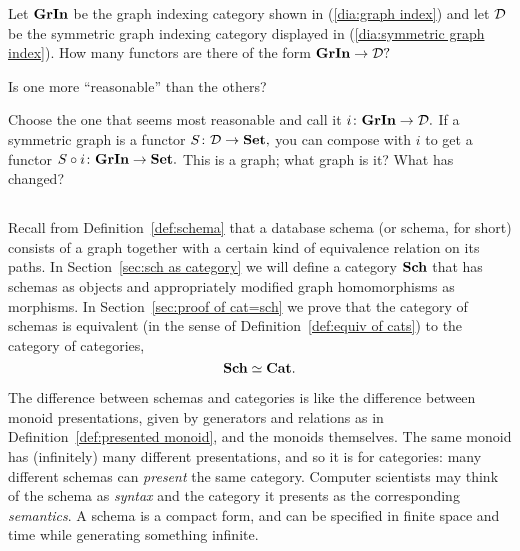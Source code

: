 \documentclass[../main/CT4S-EN-RU]{subfiles}
\begin{document}
\begin{exerciseRUS}
\end{exerciseRUS}

\begin{exerciseENG}
Let ${\mathbf{GrIn}}$ be the graph indexing category shown in (\ref{dia:graph index}) and let $\mathcal{D}$ be the symmetric graph indexing category displayed in (\ref{dia:symmetric graph index}).
\sexc How many functors are there of the form ${\mathbf{GrIn}}\rightarrow\mathcal{D}?$
\item Is one more “reasonable” than the others? 
\item Choose the one that seems most reasonable and call it $i\colon{\mathbf{GrIn}}\rightarrow\mathcal{D}.$ If a symmetric graph is a functor $S\colon\mathcal{D}\rightarrow{\mathbf{Set}},$ you can compose with $i$ to get a functor $S\circ i\colon{\mathbf{GrIn}}\rightarrow{\mathbf{Set}}.$ This is a graph; what graph is it? What has changed?
\endsexc
\end{exerciseENG}

\begin{exerciseRUS}
\end{exerciseRUS}


\subsection{}\label{sec:schemas and cats intro}

\begin{blockENG}
Recall from Definition~\ref{def:schema} that a database schema (or schema, for short) consists of a graph together with a certain kind of equivalence relation on its paths. In Section~\ref{sec:sch as category} we will define a category ${\mathbf{Sch}}$ that has schemas as objects and appropriately modified graph homomorphisms as morphisms. In Section~\ref{sec:proof of cat=sch} we prove that the category of schemas is equivalent (in the sense of Definition~\ref{def:equiv of cats}) to the category of categories, $${\mathbf{Sch}}\simeq{\mathbf{Cat}}.$$
\end{blockENG}

\begin{blockRUS}
\end{blockRUS}

\begin{blockENG}
The difference between schemas and categories is like the difference between monoid presentations, given by generators and relations as in Definition~\ref{def:presented monoid}, and the monoids themselves. The same monoid has (infinitely) many different presentations, and so it is for categories: many different schemas can {\em present} the same category. Computer scientists may think of the schema as {\em syntax} and the category it presents as the corresponding {\em semantics}. A schema is a compact form, and can be specified in finite space and time while generating something infinite. 
\end{blockENG}
\end{document}
